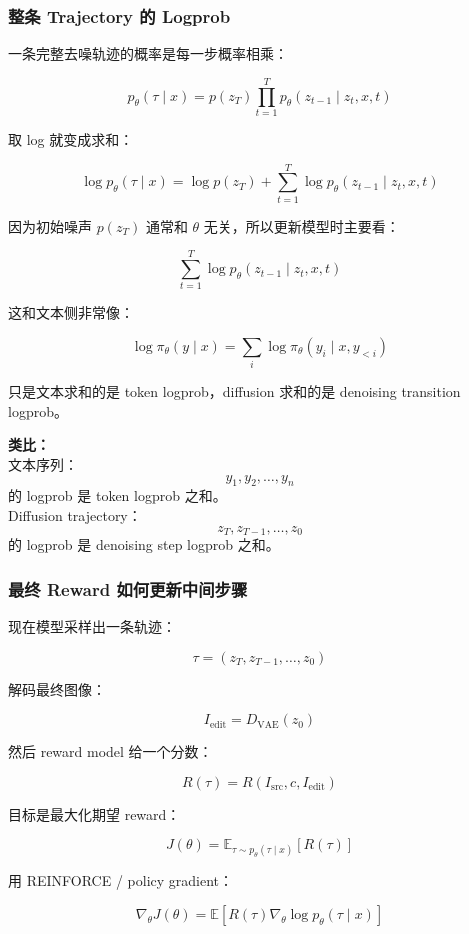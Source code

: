 \subsubsection{整条 Trajectory 的 Logprob}

一条完整去噪轨迹的概率是每一步概率相乘：

\[
p_\theta(\tau\mid x)
=
p(z_T)
\prod_{t=1}^{T}
p_\theta(z_{t-1}\mid z_t,x,t)
\]

取 log 就变成求和：

\[
\log p_\theta(\tau\mid x)
=
\log p(z_T)
+
\sum_{t=1}^{T}
\log
p_\theta(z_{t-1}\mid z_t,x,t)
\]

因为初始噪声 $p(z_T)$ 通常和 $\theta$ 无关，所以更新模型时主要看：

\[
\sum_{t=1}^{T}
\log
p_\theta(z_{t-1}\mid z_t,x,t)
\]

这和文本侧非常像：

\[
\log \pi_\theta(y\mid x)
=
\sum_i
\log \pi_\theta(y_i\mid x,y_{<i})
\]

只是文本求和的是 token logprob，diffusion 求和的是 denoising transition logprob。

\begin{summarybox}
\textbf{类比：}\\
文本序列：
\[
y_1,y_2,\ldots,y_n
\]
的 logprob 是 token logprob 之和。\\
Diffusion trajectory：
\[
z_T,z_{T-1},\ldots,z_0
\]
的 logprob 是 denoising step logprob 之和。
\end{summarybox}

\subsubsection{最终 Reward 如何更新中间步骤}

现在模型采样出一条轨迹：

\[
\tau=(z_T,z_{T-1},\ldots,z_0)
\]

解码最终图像：

\[
I_\text{edit}=D_\text{VAE}(z_0)
\]

然后 reward model 给一个分数：

\[
R(\tau)
=
R(I_\text{src},c,I_\text{edit})
\]

目标是最大化期望 reward：

\[
J(\theta)
=
\mathbb{E}_{\tau\sim p_\theta(\tau\mid x)}
\left[
R(\tau)
\right]
\]

用 REINFORCE / policy gradient：

\[
\nabla_\theta J(\theta)
=
\mathbb{E}
\left[
R(\tau)
\nabla_\theta
\log p_\theta(\tau\mid x)
\right]
\]

